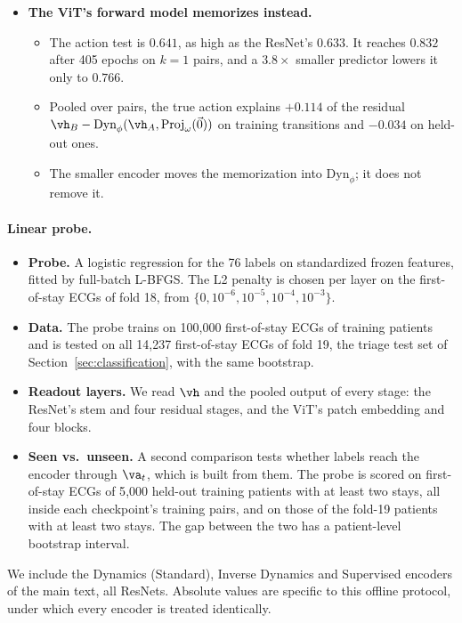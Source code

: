 \begin{itemize}
\begin{itemize}
  \end{itemize}
\item \textbf{The ViT's forward model memorizes instead.}
  \begin{itemize}
  \item The action test is $0.641$, as high as the ResNet's $0.633$. It reaches $0.832$ after 405 epochs on $k=1$ pairs, and a $3.8\times$ smaller predictor lowers it only to $0.766$.
  \item Pooled over pairs, the true action explains $+0.114$ of the residual $\vh_B-\text{Dyn}_\phi(\vh_A,\text{Proj}_\omega(\vec 0))$ on training transitions and $-0.034$ on held-out ones.
  \item The smaller encoder moves the memorization into $\text{Dyn}_\phi$; it does not remove it.
  \end{itemize}
\end{itemize}

\paragraph{Linear probe.}
\begin{itemize}
\item \textbf{Probe.} A logistic regression for the 76 labels on standardized frozen features, fitted by full-batch L-BFGS. The L2 penalty is chosen per layer on the first-of-stay ECGs of fold 18, from $\{0, 10^{-6}, 10^{-5}, 10^{-4}, 10^{-3}\}$.
\item \textbf{Data.} The probe trains on 100{,}000 first-of-stay ECGs of training patients and is tested on all 14{,}237 first-of-stay ECGs of fold 19, the triage test set of Section~\ref{sec:classification}, with the same bootstrap.
\item \textbf{Readout layers.} We read $\vh$ and the pooled output of every stage: the ResNet's stem and four residual stages, and the ViT's patch embedding and four blocks.
\item \textbf{Seen vs.\ unseen.} A second comparison tests whether labels reach the encoder through $\va_t$, which is built from them. The probe is scored on first-of-stay ECGs of 5{,}000 held-out training patients with at least two stays, all inside each checkpoint's training pairs, and on those of the fold-19 patients with at least two stays. The gap between the two has a patient-level bootstrap interval.
\end{itemize}
We include the Dynamics (Standard), Inverse Dynamics and Supervised encoders of the main text, all ResNets. Absolute values are specific to this offline protocol, under which every encoder is treated identically.


